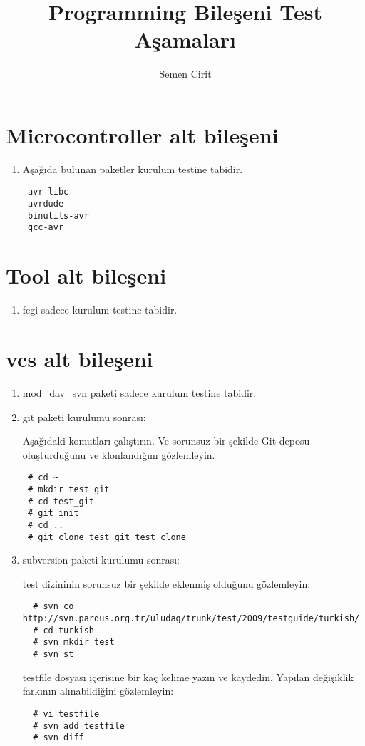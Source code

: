 \documentclass[a4paper,10pt]{article}
\title{Programming Bileşeni Test Aşamaları}
\author{Semen Cirit}
\begin{document}
\maketitle
\section{Microcontroller alt bileşeni}
\begin{enumerate}
 \item Aşağıda bulunan paketler kurulum testine tabidir.
\begin{verbatim}
 avr-libc
 avrdude
 binutils-avr
 gcc-avr
\end{verbatim}

\end{enumerate}

\section{Tool alt bileşeni}
\begin{enumerate}
 \item fcgi sadece kurulum testine tabidir.
\end{enumerate}

\section{vcs alt bileşeni}
\begin{enumerate}
\item mod\_dav\_svn paketi sadece kurulum testine tabidir.
\item git paketi kurulumu sonrası:

Aşağıdaki komutları çalıştırın. Ve sorunsuz bir şekilde Git deposu oluşturduğunu ve klonlandığını gözlemleyin.
\begin{verbatim}
 # cd ~
 # mkdir test_git
 # cd test_git
 # git init
 # cd ..
 # git clone test_git test_clone
\end{verbatim}

\item subversion paketi kurulumu sonrası:

test dizininin sorunsuz bir şekilde eklenmiş olduğunu gözlemleyin:
\begin{verbatim}
  # svn co http://svn.pardus.org.tr/uludag/trunk/test/2009/testguide/turkish/
  # cd turkish
  # svn mkdir test
  # svn st
 \end{verbatim}
testfile dosyası içerisine bir kaç kelime yazın ve kaydedin. Yapılan değişiklik farkının alınabildiğini gözlemleyin:
\begin{verbatim}
  # vi testfile
  # svn add testfile
  # svn diff
 \end{verbatim}
\end{enumerate}
\end{document}
